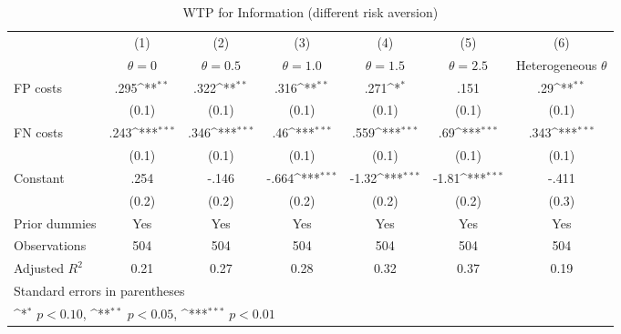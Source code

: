 \begin{table}[htbp]\centering
\def\sym#1{\ifmmode^{#1}\else\(^{#1}\)\fi}
\caption{WTP for Information (different risk aversion)}
\begin{tabular}{l*{6}{c}}
\hline\hline
                &\multicolumn{1}{c}{(1)}&\multicolumn{1}{c}{(2)}&\multicolumn{1}{c}{(3)}&\multicolumn{1}{c}{(4)}&\multicolumn{1}{c}{(5)}&\multicolumn{1}{c}{(6)}\\
                &\multicolumn{1}{c}{$\theta=0$}&\multicolumn{1}{c}{$\theta=0.5$}&\multicolumn{1}{c}{$\theta=1.0$}&\multicolumn{1}{c}{$\theta=1.5$}&\multicolumn{1}{c}{$\theta=2.5$}&\multicolumn{1}{c}{Heterogeneous $\theta$}\\
\hline
FP costs        &     .295\sym{**} &     .322\sym{**} &     .316\sym{**} &     .271\sym{*}  &     .151         &      .29\sym{**} \\
                &    (0.1)         &    (0.1)         &    (0.1)         &    (0.1)         &    (0.1)         &    (0.1)         \\
FN costs        &     .243\sym{***}&     .346\sym{***}&      .46\sym{***}&     .559\sym{***}&      .69\sym{***}&     .343\sym{***}\\
                &    (0.1)         &    (0.1)         &    (0.1)         &    (0.1)         &    (0.1)         &    (0.1)         \\
Constant        &     .254         &    -.146         &    -.664\sym{***}&    -1.32\sym{***}&    -1.81\sym{***}&    -.411         \\
                &    (0.2)         &    (0.2)         &    (0.2)         &    (0.2)         &    (0.2)         &    (0.3)         \\
Prior dummies   &      Yes         &      Yes         &      Yes         &      Yes         &      Yes         &      Yes         \\
\hline
Observations    &      504         &      504         &      504         &      504         &      504         &      504         \\
Adjusted \(R^{2}\)&     0.21         &     0.27         &     0.28         &     0.32         &     0.37         &     0.19         \\
\hline\hline
\multicolumn{7}{l}{\footnotesize Standard errors in parentheses}\\
\multicolumn{7}{l}{\footnotesize \sym{*} \(p<0.10\), \sym{**} \(p<0.05\), \sym{***} \(p<0.01\)}\\
\end{tabular}
\end{table}
